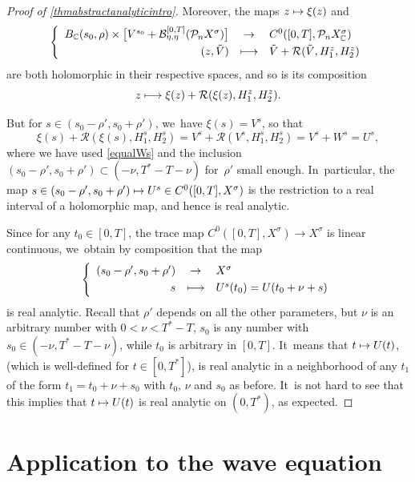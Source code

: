 \documentclass[10pt]{amsart}
\newcommand\mto{\mathchoice{\longmapsto}{\mapsto}{\mapsto}{\mapsto}}
\theoremstyle{definition}
\let\mc\mathcal
\newcommand{\B}{\mc{B}}
\renewcommand{\P}{\mathcal{P}}
\let\dpl\displaystyle
\begin{document}
\begin{proof}[Proof of \cref{thmabstractanalyticintro}]
Moreover, the maps $z\mto \xi(z)$ and
\begin{align*}
\left\{\begin{array}{rcl}
B_{\mathbb{C}}(s_0, \rho)\times \bigl[V^{s_0}+ \B_{\eta,\eta}^{[0,T]}(\P_n X^{\sigma})\bigr]&\dpl\to& C^0([0, T], \P_n X_{\mathbb{C}}^\sigma)\\[3pt]
(z,\Tilde{V})&\dpl\mto&\Tilde{V}+ \mathcal{R}(\Tilde{V},H_{1}^z,H_{2}^z)
\end{array}\right.
\end{align*}
are both holomorphic in their respective spaces, and so is its composition\vspace*{-3pt}
\[
z\mto \xi(z)+\mathcal{R}(\xi(z),H_{1}^z,H_{2}^z).
\]

But for $s\in (s_0-\rho',s_0+\rho')$, we~have $\xi(s)=V^s$, so that
\[
\xi(s)+\mathcal{R}(\xi(s),H_{1}^s,H_{2}^s)=V^s+\mathcal{R}(V^s,H_{1}^s,H_{2}^s)=V^s+W^s=U^s,
\]
where we have used \eqref{equalWs} and the inclusion $(s_0-\rho',s_0+\rho')\subset (-\nu,T^*-T-\nu)$ for~$\rho'$ small enough. In~particular, the map $s\in (s_0-\rho',s_0+\rho')\mto U^s\in C^0([0, T], X^\sigma)$ is the restriction to a real interval of a holomorphic map, and hence is real analytic.

Since for any $t_0\in [0,T]$, the trace map $C^0([0, T], X^\sigma)\to X^\sigma$ is linear continuous, we~obtain by composition that the map\vspace*{-3pt}
\begin{align*}
\left\{\begin{array}{rcl}
(s_0-\rho',s_0+\rho')&\dpl\to& X^\sigma\\[3pt]
s&\dpl\mto&U^s(t_0)=U(t_0+\nu+s)
\end{array}\right.
\end{align*}
is real analytic. Recall that $\rho'$ depends on all the other parameters, but $\nu$ is an arbitrary number with $0<\nu<T^*-T$, $s_0$ is any number with $s_0\in (-\nu,T^*-T-\nu)$, while $t_0$ is arbitrary in $[0,T]$. It~means that $t\mto U(t)$, (which is well-defined for $t\in [0,T^*]$), is real analytic in a neighborhood of any $t_1$ of the form $t_1=t_0+\nu+s_0$ with $t_0$, $\nu$ and $s_0$ as before. It~is not hard to see that this implies that $t\mto U(t)$ is real analytic on $(0,T^*)$, as expected.
\end{proof}

\section{Application to the wave equation}\label{SEC:wave-eq}
\end{document}
